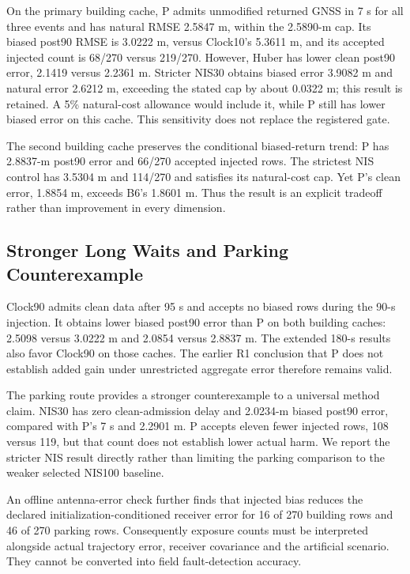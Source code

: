 \documentclass[conference]{IEEEtran}
\begin{document}
On the primary building cache, P admits unmodified returned GNSS in 7 s for all three events and has natural RMSE 2.5847 m, within the 2.5890-m cap. Its biased post90 RMSE is 3.0222 m, versus Clock10's 5.3611 m, and its accepted injected count is 68/270 versus 219/270. However, Huber has lower clean post90 error, 2.1419 versus 2.2361 m. Stricter NIS30 obtains biased error 3.9082 m and natural error 2.6212 m, exceeding the stated cap by about 0.0322 m; this result is retained. A 5\% natural-cost allowance would include it, while P still has lower biased error on this cache. This sensitivity does not replace the registered gate.

The second building cache preserves the conditional biased-return trend: P has 2.8837-m post90 error and 66/270 accepted injected rows. The strictest NIS control has 3.5304 m and 114/270 and satisfies its natural-cost cap. Yet P's clean error, 1.8854 m, exceeds B6's 1.8601 m. Thus the result is an explicit tradeoff rather than improvement in every dimension.

\subsection{Stronger Long Waits and Parking Counterexample}
Clock90 admits clean data after 95 s and accepts no biased rows during the 90-s injection. It obtains lower biased post90 error than P on both building caches: 2.5098 versus 3.0222 m and 2.0854 versus 2.8837 m. The extended 180-s results also favor Clock90 on those caches. The earlier R1 conclusion that P does not establish added gain under unrestricted aggregate error therefore remains valid.

The parking route provides a stronger counterexample to a universal method claim. NIS30 has zero clean-admission delay and 2.0234-m biased post90 error, compared with P's 7 s and 2.2901 m. P accepts eleven fewer injected rows, 108 versus 119, but that count does not establish lower actual harm. We report the stricter NIS result directly rather than limiting the parking comparison to the weaker selected NIS100 baseline.

An offline antenna-error check further finds that injected bias reduces the declared initialization-conditioned receiver error for 16 of 270 building rows and 46 of 270 parking rows. Consequently exposure counts must be interpreted alongside actual trajectory error, receiver covariance and the artificial scenario. They cannot be converted into field fault-detection accuracy.
\end{document}
